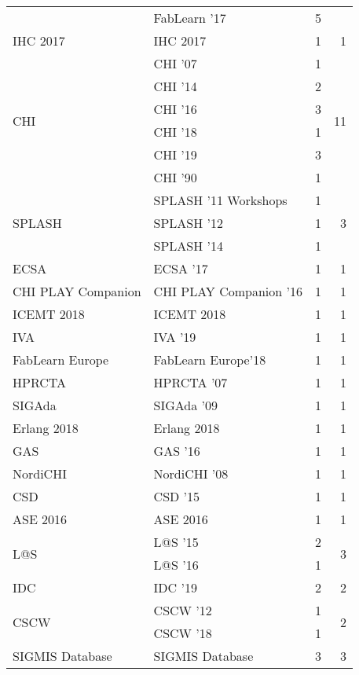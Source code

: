 \begin{table*}[t]
\begin{tabular}{llrr}
& FabLearn '17 & 5 &\\
\multirow{1}{*}{IHC 2017} & IHC 2017 & 1 & \multirow{1}{*}{1}\\
\multirow{6}{*}{CHI } & CHI '07 & 1 & \multirow{6}{*}{11}\\
& CHI '14 & 2 &\\
& CHI '16 & 3 &\\
& CHI '18 & 1 &\\
& CHI '19 & 3 &\\
& CHI '90 & 1 &\\
\multirow{3}{*}{SPLASH } & SPLASH '11 Workshops & 1 & \multirow{3}{*}{3}\\
& SPLASH '12 & 1 &\\
& SPLASH '14 & 1 &\\
\multirow{1}{*}{ECSA } & ECSA '17 & 1 & \multirow{1}{*}{1}\\
\multirow{1}{*}{CHI PLAY Companion } & CHI PLAY Companion '16 & 1 & \multirow{1}{*}{1}\\
\multirow{1}{*}{ICEMT 2018} & ICEMT 2018 & 1 & \multirow{1}{*}{1}\\
\multirow{1}{*}{IVA } & IVA '19 & 1 & \multirow{1}{*}{1}\\
\multirow{1}{*}{FabLearn Europe} & FabLearn Europe'18 & 1 & \multirow{1}{*}{1}\\
\multirow{1}{*}{HPRCTA } & HPRCTA '07 & 1 & \multirow{1}{*}{1}\\
\multirow{1}{*}{SIGAda } & SIGAda '09 & 1 & \multirow{1}{*}{1}\\
\multirow{1}{*}{Erlang 2018} & Erlang 2018 & 1 & \multirow{1}{*}{1}\\
\multirow{1}{*}{GAS } & GAS '16 & 1 & \multirow{1}{*}{1}\\
\multirow{1}{*}{NordiCHI } & NordiCHI '08 & 1 & \multirow{1}{*}{1}\\
\multirow{1}{*}{CSD } & CSD '15 & 1 & \multirow{1}{*}{1}\\
\multirow{1}{*}{ASE 2016} & ASE 2016 & 1 & \multirow{1}{*}{1}\\
\multirow{2}{*}{L@S } & L@S '15 & 2 & \multirow{2}{*}{3}\\
& L@S '16 & 1 &\\
\multirow{1}{*}{IDC } & IDC '19 & 2 & \multirow{1}{*}{2}\\
\multirow{2}{*}{CSCW } & CSCW '12 & 1 & \multirow{2}{*}{2}\\
& CSCW '18 & 1 &\\
\multirow{1}{*}{SIGMIS Database} & SIGMIS Database & 3 & \multirow{1}{*}{3}\\

\end{tabular}
\end{table*}
